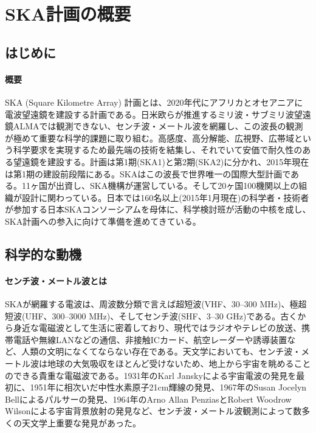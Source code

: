 \setcounter{section}{0}\section{SKA計画の概要}
\label{c01.s1}

\subsection{はじめに}
\label{c01.s1.ss1}

\paragraph{概要}

SKA (Square Kilometre Array) 計画とは、2020年代にアフリカとオセアニアに電波望遠鏡を建設する計画である。日米欧らが推進するミリ波・サブミリ波望遠鏡ALMAでは観測できない、センチ波・メートル波を網羅し、この波長の観測が極めて重要な科学的課題に取り組む。高感度、高分解能、広視野、広帯域という科学要求を実現するため最先端の技術を結集し、それでいて安価で耐久性のある望遠鏡を建設する。計画は第1期(SKA1)と第2期(SKA2)に分かれ、2015年現在は第1期の建設前段階にある。SKAはこの波長で世界唯一の国際大型計画である。11ヶ国が出資し、SKA機構が運営している。そして20ヶ国100機関以上の組織が設計に関わっている。日本では160名以上(2015年1月現在)の科学者・技術者が参加する日本SKAコンソーシアムを母体に、科学検討班が活動の中核を成し、SKA計画への参入に向けて準備を進めてきている。

\subsection{科学的な動機}
\label{c01.s1.ss2}

\paragraph{センチ波・メートル波とは}

SKAが網羅する電波は、周波数分類で言えば超短波(VHF、30--300 MHz)、極超短波(UHF、300--3000 MHz)、そしてセンチ波(SHF、3--30 GHz)である。古くから身近な電磁波として生活に密着しており、現代ではラジオやテレビの放送、携帯電話や無線LANなどの通信、非接触ICカード、航空レーダーや誘導装置など、人類の文明になくてならない存在である。天文学においても、センチ波・メートル波は地球の大気吸収をほとんど受けないため、地上から宇宙を眺めることのできる貴重な電磁波である。1931年のKarl Janskyによる宇宙電波の発見を最初に、1951年に相次いだ中性水素原子21cm輝線の発見、1967年のSusan Jocelyn Bellによるパルサーの発見、1964年のArno Allan PenziasとRobert Woodrow Wilsonによる宇宙背景放射の発見など、センチ波・メートル波観測によって数多くの天文学上重要な発見があった。

